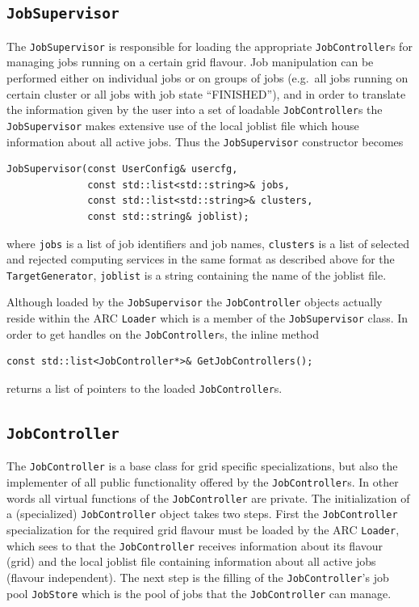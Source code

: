 \documentclass{book}
\newcommand{\JobController}{\texttt{JobController}}
\newcommand{\JobSupervisor}{\texttt{JobSupervisor}}
\newcommand{\Loader}{\texttt{Loader}}
\newcommand{\TargetGenerator}{\texttt{TargetGenerator}}
\begin{document}
\subsection{{\JobSupervisor}}

The {\JobSupervisor} is responsible for loading the appropriate
{\JobController}s for managing jobs running on a certain grid
flavour. Job manipulation can be performed either on individual jobs
or on groups of jobs (e.g.\ all jobs running on certain cluster or all
jobs with job state ``FINISHED''), and in order to translate the
information given by the user into a set of loadable {\JobController}s
the {\JobSupervisor} makes extensive use of the local joblist file
which house information about all active jobs. Thus the {\JobSupervisor}
constructor becomes

\begin{shaded}
\begin{verbatim}
JobSupervisor(const UserConfig& usercfg,
              const std::list<std::string>& jobs,
              const std::list<std::string>& clusters,
              const std::string& joblist);
\end{verbatim}
\end{shaded}

where \texttt{jobs} is a list of job identifiers and job names,
\texttt{clusters} is a list of selected and rejected computing
services in the same format as described above for the
{\TargetGenerator}, \texttt{joblist} is a string containing the name
of the joblist file.

Although loaded by the {\JobSupervisor} the {\JobController}
objects actually reside within the ARC {\Loader} which is a member of
the {\JobSupervisor} class. In order to get handles on the
{\JobController}s, the inline method

\begin{shaded}
\begin{verbatim}
const std::list<JobController*>& GetJobControllers();
\end{verbatim}
\end{shaded}

returns a list of pointers to the loaded {\JobController}s.

\subsection{{\JobController}}

The {\JobController} is a base class for grid specific
specializations, but also the implementer of all public functionality
offered by the {\JobController}s. In other words all virtual functions
of the {\JobController} are private. The initialization of a
(specialized) {\JobController} object takes two steps. First the
{\JobController} specialization for the required grid flavour must be
loaded by the ARC {\Loader}, which sees to that the {\JobController}
receives information about its flavour (grid) and the local joblist
file containing information about all active jobs (flavour
independent). The next step is the filling of the {\JobController}'s job
pool \texttt{JobStore} which is the pool of jobs that the
{\JobController} can manage.
\end{document}
